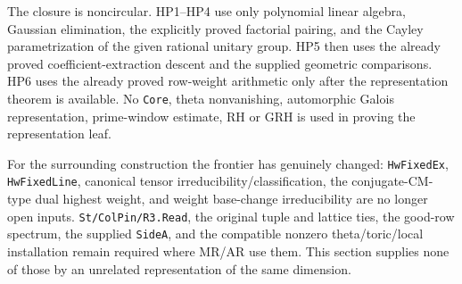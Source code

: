The closure is noncircular.  HP1--HP4 use only polynomial linear
algebra, Gaussian elimination, the explicitly proved factorial
pairing, and the Cayley parametrization of the given rational
unitary group.  HP5 then uses the already proved coefficient-extraction
descent and the supplied geometric comparisons.  HP6 uses the already
proved row-weight arithmetic only after the representation theorem is
available.  No \texttt{Core}, theta nonvanishing, automorphic Galois
representation, prime-window estimate, RH or GRH is used in proving
the representation leaf.

For the surrounding construction the frontier has genuinely changed:
\texttt{HwFixedEx}, \texttt{HwFixedLine}, canonical tensor
irreducibility/classification, the conjugate-CM-type dual highest
weight, and weight base-change irreducibility are no longer open
inputs.  \texttt{St/ColPin/R3.Read}, the original tuple and lattice
ties, the good-row spectrum, the supplied \texttt{SideA}, and the
compatible nonzero theta/toric/local installation remain required
where MR/AR use them.  This section supplies none of those by an
unrelated representation of the same dimension.
